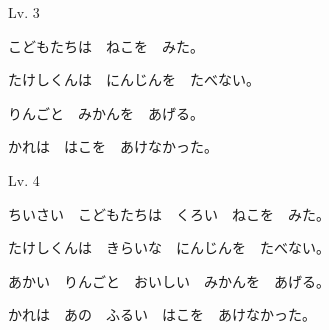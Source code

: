 	\vspace{-10pt}
	\begin{mondai}{Lv. 3}
		\item こどもたちは　ねこを　みた。
		\item たけしくんは　にんじんを　たべない。
		\item りんごと　みかんを　あげる。
		\item かれは　はこを　あけなかった。
	\end{mondai}

	\vspace{-10pt}
	\begin{mondai}{Lv. 4}
		\item ちいさい　こどもたちは　くろい　ねこを　みた。
		\item たけしくんは　きらいな　にんじんを　たべない。
		\item あかい　りんごと　おいしい　みかんを　あげる。
		\item かれは　あの　ふるい　はこを　あけなかった。
	\end{mondai}

